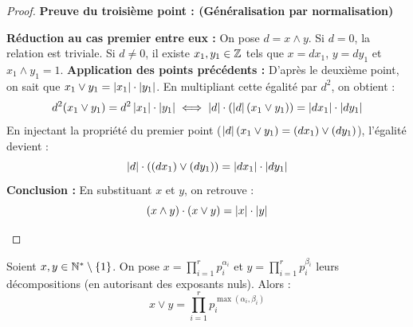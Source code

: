 \documentclass[12pt, a4paper]{report}
\begin{document}
\begin{proof}
    \textbf{Preuve du troisième point : (Généralisation par normalisation)}
    \begin{outline}
        \1 \textbf{Réduction au cas premier entre eux :}
            \2 On pose $d = x \wedge y$. Si $d = 0$, la relation est triviale. Si $d \neq 0$, il existe $x_1, y_1 \in \mathbb{Z}$ tels que $x = dx_1$, $y = dy_1$ et $x_1 \wedge y_1 = 1$.
        \1 \textbf{Application des points précédents :}
            \2 D'après le deuxième point, on sait que $x_1 \vee y_1 = \left|x_1\right|\cdot\left|y_1\right|$.
            \2 En multipliant cette égalité par $d^2$, on obtient :
               \[ d^2 (x_1 \vee y_1) = d^2 \left|x_1\right|\cdot\left|y_1\right| \iff \left|d\right| \cdot \left( \left|d\right| (x_1 \vee y_1) \right) = \left|dx_1\right| \cdot \left|dy_1\right| \]
            \2 En injectant la propriété du premier point ($\left|d\right|(x_1 \vee y_1) = (dx_1) \vee (dy_1)$), l'égalité devient :
               \[ \left|d\right| \cdot \left( (dx_1) \vee (dy_1) \right) = \left|dx_1\right| \cdot \left|dy_1\right| \]
        \1 \textbf{Conclusion :}
            \2 En substituant $x$ et $y$, on retrouve :
               \[ (x \wedge y) \cdot (x \vee y) = \left|x\right|\cdot\left|y\right| \]
    \end{outline}
\end{proof}

\begin{theorem}
    Soient $x,y \in \mathbb{N}^*\setminus\{1\}$.
    On pose $x = \prod_{i=1}^r p_i^{\alpha_i}$ et $y = \prod_{i=1}^r p_i^{\beta_i}$ leurs décompositions (en autorisant des exposants nuls).
    Alors :
    $$x \vee y = \prod_{i=1}^r p_i^{\max(\alpha_i,\beta_i)}$$
\end{theorem}
\end{document}
